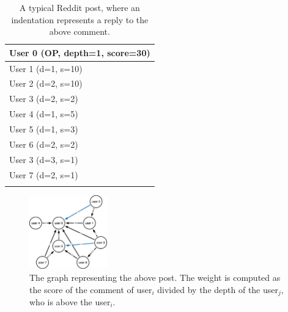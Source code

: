 \begin{table}
\centering
\begin{tabular}{l}
User 0 (OP, depth=1, score=30)  \\
\hline
\hspace{1cm} User 1 (d=1, s=10)              \\
\hline
\hspace{2cm} User 2 (d=2, s=10)            \\
\hline
\hspace{2cm} User 3 (d=2, s=2)             \\
\hline
\hspace{1cm} User 4 (d=1, s=5)             \\
\hline
\hspace{1cm} User 5 (d=1, s=3)             \\
\hline
\hspace{2cm} User 6 (d=2, s=2)             \\
\hline
\hspace{3cm} User 3 (d=3, s=1)             \\
\hline
\hspace{2cm} User  7 (d=2, s=1)            \\
\hspace{6.5cm}
\end{tabular}
\caption{A typical Reddit post, where an indentation represents a reply to the above comment.}
\end{table}

\begin{figure}[H]
    \centering
    \includegraphics[width=0.3\textwidth]{figures/graph_model.png}
    \caption{The graph representing the above post. The weight is computed as the score of the comment of user$_i$ divided by the depth of the user$_j$, who is above the user$_i$.}
    \label{fig:graphmodel}
\end{figure}



